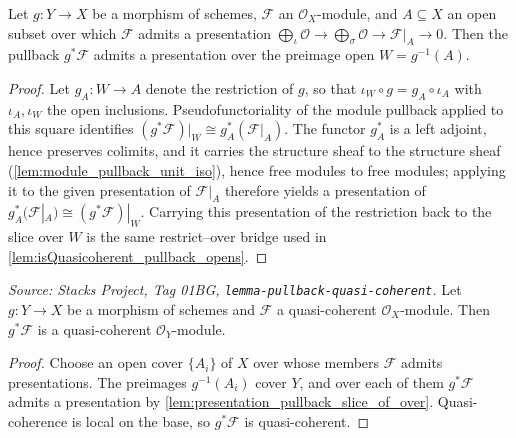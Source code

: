\begin{lemma}
  \label{lem:presentation_pullback_slice_of_over}
  Let \(g : Y \to X\) be a morphism of schemes, \(\mathcal{F}\) an \(\mathcal{O}_X\)-module,
  and \(A \subseteq X\) an open subset over which \(\mathcal{F}\) admits a presentation
  \(\bigoplus_{\iota}\mathcal{O} \to \bigoplus_{\sigma}\mathcal{O} \to \mathcal{F}|_A \to 0\).
  Then the pullback \(g^*\mathcal{F}\) admits a presentation over the preimage open
  \(W = g^{-1}(A)\).
\end{lemma}
\begin{proof}\leanok
  Let \(g_A : W \to A\) denote the restriction of \(g\), so that
  \(\iota_W \circ g = g_A \circ \iota_A\) with \(\iota_A, \iota_W\) the open inclusions.
  Pseudofunctoriality of the module pullback applied to this square identifies
  \((g^*\mathcal{F})|_W \cong g_A^*(\mathcal{F}|_A)\). The functor \(g_A^*\) is a left
  adjoint, hence preserves colimits, and it carries the structure sheaf to the structure
  sheaf (\cref{lem:module_pullback_unit_iso}), hence free modules to free modules; applying it to
  the given presentation of \(\mathcal{F}|_A\) therefore yields a presentation of
  \(g_A^*(\mathcal{F}|_A) \cong (g^*\mathcal{F})|_W\). Carrying this presentation of the
  restriction back to the slice over \(W\) is the same restrict--over bridge used in
  \cref{lem:isQuasicoherent_pullback_opens}.
\end{proof}

\begin{lemma}
  \label{lem:pullback_isQuasicoherent_hom}
  \textit{Source: Stacks Project, Tag 01BG, \texttt{lemma-pullback-quasi-coherent}.}
  Let \(g : Y \to X\) be a morphism of schemes and \(\mathcal{F}\) a quasi-coherent
  \(\mathcal{O}_X\)-module. Then \(g^*\mathcal{F}\) is a quasi-coherent
  \(\mathcal{O}_Y\)-module.
\end{lemma}
\begin{proof}\leanok
  Choose an open cover \(\{A_i\}\) of \(X\) over whose members \(\mathcal{F}\) admits
  presentations. The preimages \(g^{-1}(A_i)\) cover \(Y\), and over each of them
  \(g^*\mathcal{F}\) admits a presentation by
  \cref{lem:presentation_pullback_slice_of_over}. Quasi-coherence is local on the base, so
  \(g^*\mathcal{F}\) is quasi-coherent.
\end{proof}


